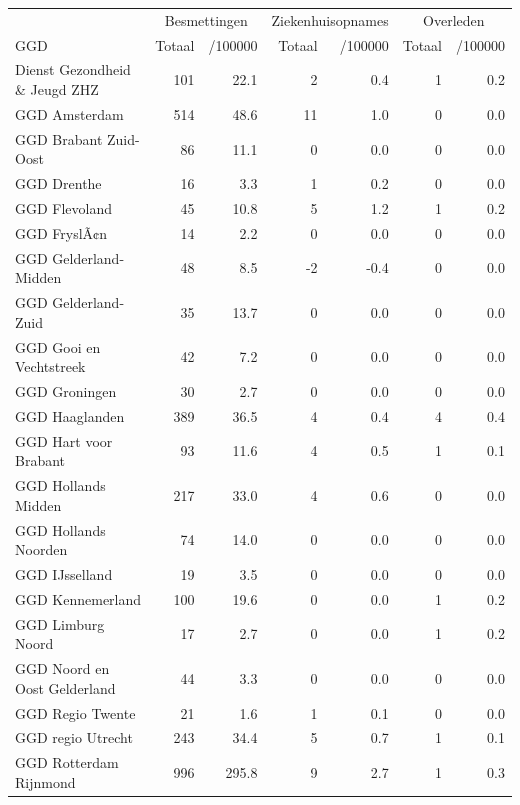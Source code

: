 \documentclass[
  english,
  man,floatsintext]{apa6}
\begin{document}
\begin{table}[H]
\centering\begingroup\fontsize{10}{12}\selectfont

\begin{threeparttable}
\begin{tabular}{lrrrrrr}
\toprule
\multicolumn{1}{c}{ } & \multicolumn{2}{c}{Besmettingen} & \multicolumn{2}{c}{Ziekenhuisopnames} & \multicolumn{2}{c}{Overleden} \\
\cmidrule(l{3pt}r{3pt}){2-3} \cmidrule(l{3pt}r{3pt}){4-5} \cmidrule(l{3pt}r{3pt}){6-7}
GGD & Totaal & /100000 & Totaal & /100000 & Totaal & /100000\\
\midrule
Dienst Gezondheid \& Jeugd ZHZ & 101 & 22.1 & 2 & 0.4 & 1 & 0.2\\
GGD Amsterdam & 514 & 48.6 & 11 & 1.0 & 0 & 0.0\\
GGD Brabant Zuid-Oost & 86 & 11.1 & 0 & 0.0 & 0 & 0.0\\
GGD Drenthe & 16 & 3.3 & 1 & 0.2 & 0 & 0.0\\
GGD Flevoland & 45 & 10.8 & 5 & 1.2 & 1 & 0.2\\
GGD FryslÃ¢n & 14 & 2.2 & 0 & 0.0 & 0 & 0.0\\
GGD Gelderland-Midden & 48 & 8.5 & -2 & -0.4 & 0 & 0.0\\
GGD Gelderland-Zuid & 35 & 13.7 & 0 & 0.0 & 0 & 0.0\\
GGD Gooi en Vechtstreek & 42 & 7.2 & 0 & 0.0 & 0 & 0.0\\
GGD Groningen & 30 & 2.7 & 0 & 0.0 & 0 & 0.0\\
GGD Haaglanden & 389 & 36.5 & 4 & 0.4 & 4 & 0.4\\
GGD Hart voor Brabant & 93 & 11.6 & 4 & 0.5 & 1 & 0.1\\
GGD Hollands Midden & 217 & 33.0 & 4 & 0.6 & 0 & 0.0\\
GGD Hollands Noorden & 74 & 14.0 & 0 & 0.0 & 0 & 0.0\\
GGD IJsselland & 19 & 3.5 & 0 & 0.0 & 0 & 0.0\\
GGD Kennemerland & 100 & 19.6 & 0 & 0.0 & 1 & 0.2\\
GGD Limburg Noord & 17 & 2.7 & 0 & 0.0 & 1 & 0.2\\
GGD Noord en Oost Gelderland & 44 & 3.3 & 0 & 0.0 & 0 & 0.0\\
GGD Regio Twente & 21 & 1.6 & 1 & 0.1 & 0 & 0.0\\
GGD regio Utrecht & 243 & 34.4 & 5 & 0.7 & 1 & 0.1\\
GGD Rotterdam Rijnmond & 996 & 295.8 & 9 & 2.7 & 1 & 0.3\\

\end{tabular}
\end{threeparttable}
\end{table}
\end{document}
